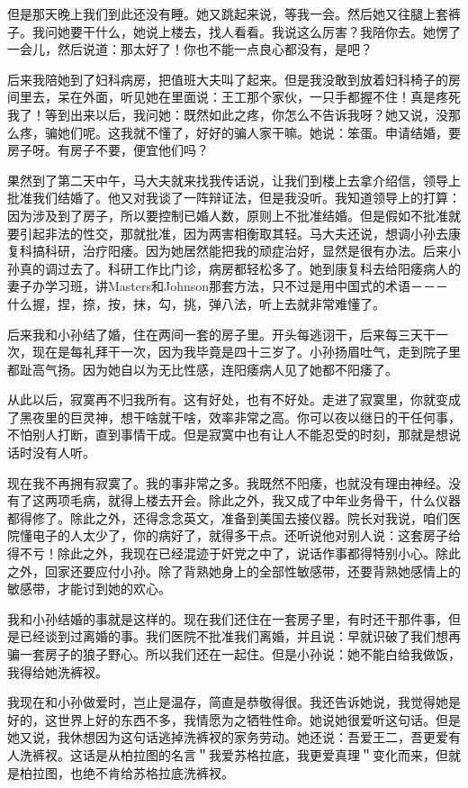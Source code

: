 但是那天晚上我们到此还没有睡。她又跳起来说，等我一会。然后她又往腿上套裤子。我问她要干什么，她说上楼去，找人看看。我说这么厉害？我陪你去。她愣了一会儿，然后说道：那太好了！你也不能一点良心都没有，是吧？ 

后来我陪她到了妇科病房，把值班大夫叫了起来。但是我没敢到放着妇科椅子的房间里去，呆在外面，听见她在里面说：王工那个家伙，一只手都握不住！真是疼死我了！等到出来以后，我问她：既然如此之疼，你怎么不告诉我呀？她又说，没那么疼，骗她们呢。这我就不懂了，好好的骗人家干嘛。她说：笨蛋。申请结婚，要房子呀。有房子不要，便宜他们吗？ 

果然到了第二天中午，马大夫就来找我传话说，让我们到楼上去拿介绍信，领导上批准我们结婚了。他又对我谈了一阵辩证法，但是我没听。我知道领导上的打算：因为涉及到了房子，所以要控制已婚人数，原则上不批准结婚。但是假如不批准就要引起非法的性交，那就批准，因为两害相衡取其轻。马大夫还说，想调小孙去康复科搞科研，治疗阳痿。因为她居然能把我的顽症治好，显然是很有办法。后来小孙真的调过去了。科研工作比门诊，病房都轻松多了。她到康复科去给阳痿病人的妻子办学习班，讲Masters和Johnson那套方法，只不过是用中国式的术语－－－什么握，捏，捺，按，抹，勾，挑，弹八法，听上去就非常难懂了。 

后来我和小孙结了婚，住在两间一套的房子里。开头每逃诩干，后来每三天干一次，现在是每礼拜干一次，因为我毕竟是四十三岁了。小孙扬眉吐气，走到院子里都趾高气扬。因为她自以为无比性感，连阳痿病人见了她都不阳痿了。 

从此以后，寂寞再不归我所有。这有好处，也有不好处。走进了寂寞里，你就变成了黑夜里的巨灵神，想干啥就干啥，效率非常之高。你可以夜以继日的干任何事，不怕别人打断，直到事情干成。但是寂寞中也有让人不能忍受的时刻，那就是想说话时没有人听。 

现在我不再拥有寂寞了。我的事非常之多。我既然不阳痿，也就没有理由神经。没有了这两项毛病，就得上楼去开会。除此之外，我又成了中年业务骨干，什么仪器都得修了。除此之外，还得念念英文，准备到美国去接仪器。院长对我说，咱们医院懂电子的人太少了，你的病好了，就得多干点。还听说他对别人说：这套房子给得不亏！除此之外，我现在已经混迹于奸党之中了，说话作事都得特别小心。除此之外，回家还要应付小孙。除了背熟她身上的全部性敏感带，还要背熟她感情上的敏感带，才能讨到她的欢心。 

我和小孙结婚的事就是这样的。现在我们还住在一套房子里，有时还干那件事，但是已经谈到过离婚的事。我们医院不批准我们离婚，并且说：早就识破了我们想再骗一套房子的狼子野心。所以我们还在一起住。但是小孙说：她不能白给我做饭，我得给她洗裤衩。 

我现在和小孙做爱时，岂止是温存，简直是恭敬得很。我还告诉她说，我觉得她是好的，这世界上好的东西不多，我情愿为之牺牲性命。她说她很爱听这句话。但是她又说，我休想因为这句话逃掉洗裤衩的家务劳动。她还说：吾爱王二，吾更爱有人洗裤衩。这话是从柏拉图的名言＂我爱苏格拉底，我更爱真理＂变化而来，但就是柏拉图，也绝不肯给苏格拉底洗裤衩。 

